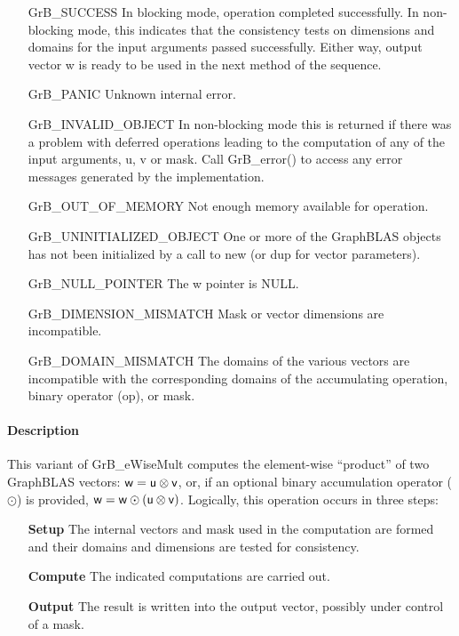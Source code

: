 \begin{itemize}[leftmargin=2.1in]
    \item[{\sf GrB\_SUCCESS}]         In blocking mode, operation
	completed successfully. In non-blocking mode, this indicates
	that the consistency tests on dimensions and domains for the
	input arguments passed successfully. Either way, output vector
	{\sf w} is ready to be used in the next method of the sequence.

    \item[{\sf GrB\_PANIC}]           Unknown internal error.
    
    \item[{\sf GrB\_INVALID\_OBJECT}] In non-blocking mode this is returned if
    there was a problem with deferred operations leading to the computation of
    any of the input arguments, {\sf u}, {\sf v} or {\sf mask}.  Call 
    {GrB\_error()} to access any error messages generated by the implementation.

    \item[{\sf GrB\_OUT\_OF\_MEMORY}] Not enough memory available for operation.
    
    \item[{\sf GrB\_UNINITIALIZED\_OBJECT}] One or more of the GraphBLAS objects 
    has not been initialized by a call to {\sf new} (or {\sf dup} for vector
    parameters).
    
    \item[{\sf GrB\_NULL\_POINTER}]  The {\sf w} pointer is {\sf NULL}.

    \item[{\sf GrB\_DIMENSION\_MISMATCH}] Mask or vector dimensions are incompatible.

	\item[{\sf GrB\_DOMAIN\_MISMATCH}]    The domains of the various
	vectors are incompatible with the corresponding domains of the
	accumulating operation, binary operator ({\sf op}), or mask.
\end{itemize}

\paragraph{Description}

This variant of {\sf GrB\_eWiseMult} computes the element-wise ``product'' of
two GraphBLAS vectors: ${\sf w} = {\sf u} \otimes {\sf v}$, or, if an optional
binary accumulation operator ($\odot$) is provided, ${\sf w} = {\sf w} \odot
\left({\sf u} \otimes {\sf v}\right)$.  Logically, this operation occurs in
three steps:
\begin{enumerate}[leftmargin=0.75in]
\item[\bf Setup] The internal vectors and mask used in the computation are formed 
and their domains and dimensions are tested for consistency.
\item[\bf Compute] The indicated computations are carried out.
\item[\bf Output] The result is written into the output vector, possibly under 
control of a mask.
\end{enumerate}

